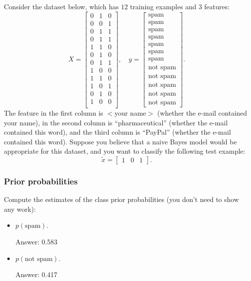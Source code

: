 \documentclass{article}
\def\ans#1{\par\gre{Answer: #1}}
\def\blu#1{{\color{blu}#1}}
\def\gre#1{{\color{gre}#1}}
\def\items#1{\begin{itemize}#1\end{itemize}}
\begin{document}
Consider the dataset below, which has $12$ training examples and $3$ features:
\[
X = \begin{bmatrix}0 & 1 & 0\\0 & 0 & 1\\0 & 1 & 1\\ 0 & 1 & 1\\ 1 & 1 & 0\\0 & 1 & 0\\0 & 1 & 1\\1 & 0 & 0\\1 & 1 & 0\\1 & 0 & 1\\0 & 1 & 0\\1 & 0 & 0\\\end{bmatrix}, \quad y = \begin{bmatrix}\text{spam}\\\text{spam}\\\text{spam}\\\text{spam}\\\text{spam}\\\text{spam}\\\text{spam}\\\text{not spam}\\\text{not spam}\\\text{not spam}\\\text{not spam}\\\text{not spam}\end{bmatrix}.
\]
The feature in the first column is $<$your name$>$ (whether the e-mail contained your name), in the second column is ``pharmaceutical'' (whether the e-mail contained this word), and the third column is ``PayPal'' (whether the e-mail contained this word).
Suppose you believe that a naive Bayes model would be appropriate for this dataset, and you want to classify the following test example:
\[
\tilde{x} = \begin{bmatrix}1 & 0 & 1\end{bmatrix}.
\]

\pagebreak

\subsubsection{Prior probabilities}

\blu{Compute the estimates of the class prior probabilities} (you don't need to show any work):
\items{
\item$ p(\text{spam})$.
\ans{0.583}
\item $p(\text{not spam})$.
\ans{0.417}
}
\end{document}
